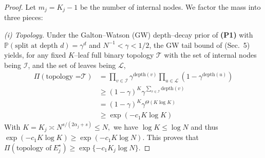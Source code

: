 \documentclass[11pt]{article}
\theoremstyle{plain}
\theoremstyle{definition}
\theoremstyle{plain}
\begin{document}
\begin{proof}
Let $m_j=K_j-1$ be the number of internal nodes. We factor the mass into three pieces:

\medskip\noindent\emph{(i) Topology.}
Under the Galton–Watson (GW) depth–decay prior of {\textbf{(P1)}} with $\mathbb P(\text{split at depth }d)=\gamma^d$ and $N^{-1}<\gamma<1/2$, the GW tail bound of \citet{rockovasaha} (Sec.\ 5) yields, for any fixed $K$–leaf full binary topology $\mathcal T$ with the set of internal nodes being $\mathcal{I}$, and the set of leaves being $\mathcal{L}$, 
\begin{equation}\label{eq:topology-mass-fixed}
\begin{split}
\Pi(\text{topology =}\mathcal{T}) & = \prod_{v \in \mathcal{I}} \gamma^{\text{depth}(v)} \prod_{u \in \mathcal{L}} (1-\gamma^{\text{depth}(u)}) \\
& \ge (1-\gamma)^{K} \gamma^{\sum_{v \in \mathcal{I}}\text{depth}(v)} \\
& = (1-\gamma)^{K} \gamma^{\Theta(K \log K)} \\
& \ge \exp(-c_1 K \log K)
\end{split}
\end{equation}
With $K=K_j \asymp N^{s/(2\alpha_j+s)} \le N,$ we have $\log K \le \log N$ and thus $\exp(-c_1 K \log K) \ge \exp(-c_1 K \log N).$ This proves that $\Pi(\text{topology of} \ E_j ^\star) \ge \exp\{-c_1K_j \log N\}.$


\end{proof}
\end{document}

